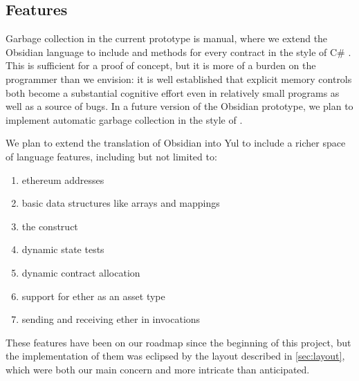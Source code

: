 
\subsection{Features}

Garbage collection in the current prototype is manual, where we extend the
Obsidian language to include  and  methods
for every contract in the style of C\# \cite{todo}. This is sufficient for
a proof of concept, but it is more of a burden on the programmer than we
envision: it is well established that explicit memory controls both become
a substantial cognitive effort even in relatively small programs as well as
a source of bugs. \cite{todo} In a future version of the Obsidian
prototype, we plan to implement automatic garbage collection in the style
of \todo{}. \cite{todo}

We plan to extend the translation of Obsidian into Yul to include a richer
space of language features, including but not limited to:
\begin{enumerate} %
\item ethereum addresses
\item basic data structures like arrays and mappings
\item the  construct
\item dynamic state tests
\item dynamic contract allocation
\item support for ether as an asset type
\item sending and receiving ether in invocations
\end{enumerate}
These features have been on our roadmap since the beginning of this
project, but the implementation of them was eclipsed by the layout
described in \ref{sec:layout}, which were both our main concern and more
intricate than anticipated.
